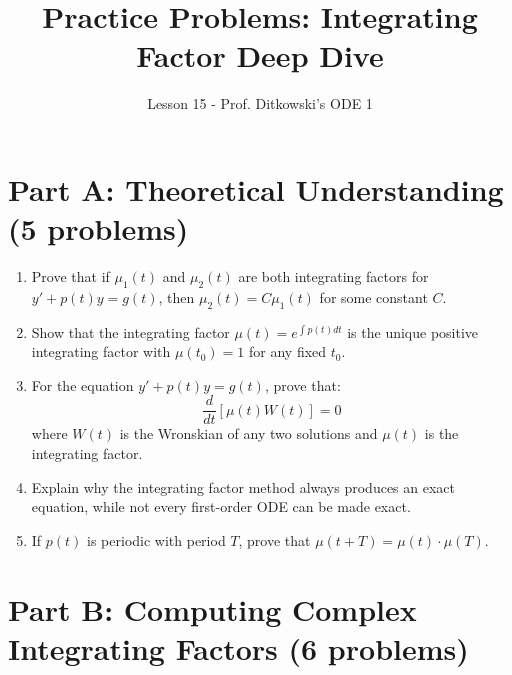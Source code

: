 \documentclass[12pt]{article}
\title{Practice Problems: Integrating Factor Deep Dive}
\author{Lesson 15 - Prof. Ditkowski's ODE 1}
\date{}
\begin{document}
\maketitle

\section*{Part A: Theoretical Understanding (5 problems)}

\begin{enumerate}
\item Prove that if $\mu_1(t)$ and $\mu_2(t)$ are both integrating factors for $y' + p(t)y = g(t)$, then $\mu_2(t) = C\mu_1(t)$ for some constant $C$.

\item Show that the integrating factor $\mu(t) = e^{\int p(t)dt}$ is the unique positive integrating factor with $\mu(t_0) = 1$ for any fixed $t_0$.

\item For the equation $y' + p(t)y = g(t)$, prove that:
\begin{equation}
\frac{d}{dt}[\mu(t)W(t)] = 0
\end{equation}
where $W(t)$ is the Wronskian of any two solutions and $\mu(t)$ is the integrating factor.

\item Explain why the integrating factor method always produces an exact equation, while not every first-order ODE can be made exact.

\item If $p(t)$ is periodic with period $T$, prove that $\mu(t+T) = \mu(t) \cdot \mu(T)$.
\end{enumerate}

\section*{Part B: Computing Complex Integrating Factors (6 problems)}
\end{document}
